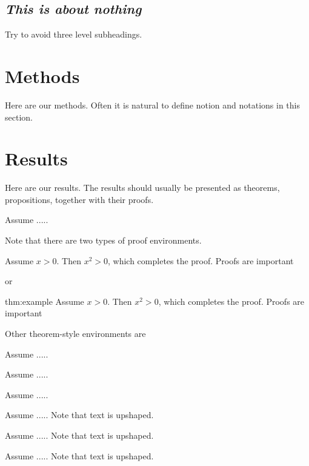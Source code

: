 \documentclass[a4paper,fleqn]{cas-sc} %
\begin{document}
\subsection*{ {\sl This is about nothing}}

\noindent\medskip
Try to avoid three level subheadings.

\section{Methods\label{sec:2}}

Here are our methods. Often it is natural to define notion and notations in this section.

\section{Results\label{sec:3}}

Here are our results. The results should usually be presented as theorems, propositions, together with their proofs.

\begin{theorem}\label{thm:example} Assume .....
\end{theorem}

Note that there are two types of proof environments.

\begin{Proof}
Assume \( x > 0 \). Then \( x^2 > 0 \), which completes the proof. Proofs are important
\end{Proof}

or
\begin{Proofx}{thm:example}%
Assume \( x > 0 \). Then \( x^2 > 0 \), which completes the proof. Proofs are important
\end{Proofx}

\medskip
Other theorem-style environments are
\begin{proposition} Assume .....
\end{proposition}
\begin{lemma} Assume .....
\end{lemma}
\begin{corollary} Assume .....
\end{corollary}

\smallskip
\begin{definition}Assume ..... Note that text is upshaped.
\end{definition}
\begin{remark} Assume ..... Note that text is upshaped.
\end{remark}
\begin{example} Assume .....  Note that text is upshaped.
\end{example}
\end{document}

